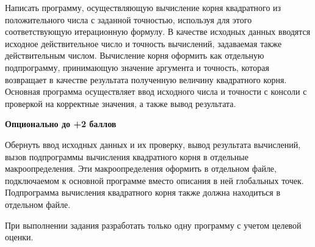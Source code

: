 Написать программу, осуществляющую вычисление корня квадратного из положительного числа с заданной точностью, используя для этого соответствующую итерационную формулу. В качестве исходных данных вводятся  исходное действительное число и точность вычислений, задаваемая также действительным числом. Вычисление корня оформить как отдельную подпрограмму, принимающую значение аргумента и точность, которая возвращает в качестве результата полученную величину квадратного корня. Основная программа осуществляет ввод исходного числа и точности с консоли с проверкой на корректные значения, а также вывод результата.

\textbf{Опционально до +2 баллов}

Обернуть ввод исходных данных и их проверку, вывод результата вычислений, вызов подпрограммы вычисления квадратного корня в отдельные макроопределения. Эти макроопределения оформить в отдельном файле, подключаемом к основной программе вместо описания в ней глобальных точек. Подпрограмма вычисления квадратного корня также должна находиться в отдельном файле.

При выполнении задания разработать только одну программу с учетом целевой оценки.

